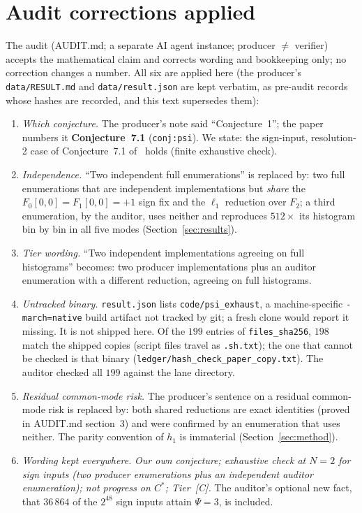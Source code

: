 \documentclass[10pt]{article}
\newcommand{\tier}[1]{\textsf{[#1]}}
\newcommand{\tC}{\tier{C}}
\begin{document}
\section{Audit corrections applied}\label{sec:corr}
The audit (AUDIT.md; a separate AI agent instance; producer $\ne$ verifier) accepts the mathematical claim and corrects wording and bookkeeping only; no correction changes a number. All six are applied here (the producer's \texttt{data/RESULT.md} and \texttt{data/result.json} are kept verbatim, as pre-audit records whose hashes are recorded, and this text supersedes them):
\begin{enumerate}\itemsep=1pt
\item \emph{Which conjecture.} The producer's note said ``Conjecture~1''; the paper numbers it \textbf{Conjecture~7.1} (\texttt{conj:psi}). We state: the sign-input, resolution-2 case of Conjecture~7.1 of~\cite{dh} holds (finite exhaustive check).
\item \emph{Independence.} ``Two independent full enumerations'' is replaced by: two full enumerations that are independent implementations but \emph{share} the $F_0[0,0]=F_1[0,0]=+1$ sign fix and the $\ell_1$ reduction over $F_2$; a third enumeration, by the auditor, uses neither and reproduces $512\times$ its histogram bin by bin in all five modes (Section~\ref{sec:results}).
\item \emph{Tier wording.} ``Two independent implementations agreeing on full histograms'' becomes: two producer implementations plus an auditor enumeration with a different reduction, agreeing on full histograms.
\item \emph{Untracked binary.} \texttt{result.json} lists \texttt{code/psi\_exhaust}, a machine-specific \texttt{-march=native} build artifact not tracked by git; a fresh clone would report it missing. It is not shipped here. Of the $199$ entries of \texttt{files\_sha256}, $198$ match the shipped copies (script files travel as \texttt{.sh.txt}); the one that cannot be checked is that binary (\texttt{ledger/hash\_check\_paper\_copy.txt}). The auditor checked all $199$ against the lane directory.
\item \emph{Residual common-mode risk.} The producer's sentence on a residual common-mode risk is replaced by: both shared reductions are exact identities (proved in AUDIT.md section~3) and were confirmed by an enumeration that uses neither. The parity convention of $h_1$ is immaterial (Section~\ref{sec:method}).
\item \emph{Wording kept everywhere.} \emph{Our own conjecture; exhaustive check at $N=2$ for sign inputs (two producer enumerations plus an independent auditor enumeration); not progress on $C^\ast$; Tier~\tC{}.} The auditor's optional new fact, that $36\,864$ of the $2^{48}$ sign inputs attain $\Psi=3$, is included.
\end{enumerate}
\end{document}
